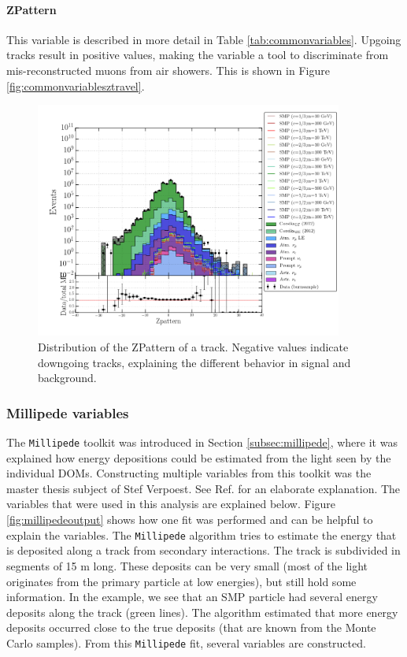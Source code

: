 \paragraph{ZPattern}
This variable is described in more detail in Table \ref{tab:commonvariables}. Upgoing tracks result in positive values, making the variable a tool to discriminate from mis-reconstructed muons from air showers. This is shown in Figure \ref{fig:commonvariablesztravel}.

\begin{figure}
\centering
\includegraphics[width = 0.9\textwidth]{chapter8/img/1D_stack_zpattern.png}
\caption{Distribution of the ZPattern of a track. Negative values indicate downgoing tracks, explaining the different behavior in signal and background.}
\label{fig:commonvariableszpattern}
\end{figure}


\subsubsection{Millipede variables}
The \texttt{Millipede} toolkit was introduced in Section \ref{subsec:millipede}, where it was explained how energy depositions could be estimated from the light seen by the individual DOMs. Constructing multiple variables from this toolkit was the master thesis subject of Stef Verpoest. See Ref. \cite{steffthesis} for an elaborate explanation. The variables that were used in this analysis are explained below. Figure \ref{fig:millipedeoutput} shows how one fit was performed and can be helpful to explain the variables. The \texttt{Millipede} algorithm tries to estimate the energy that is deposited along a track from secondary interactions. The track is subdivided in segments of 15 m long. These deposits can be very small (most of the light originates from the primary particle at low energies), but still hold some information. In the example, we see that an SMP particle had several energy deposits along the track (green lines). The algorithm estimated that more energy deposits occurred close to the true deposits (that are known from the Monte Carlo samples). From this \texttt{Millipede} fit, several variables are constructed.

